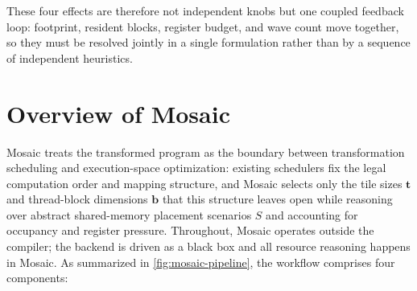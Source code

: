 \documentclass[acmsmall,review,anonymous,screen]{acmart}
\newcommand{\name}{{Mosaic}\xspace}
\newcommand{\tvec}{\mathbf{t}}
\begin{document}
These four effects are therefore not independent knobs but one coupled feedback loop: footprint, resident blocks, register budget, and wave count move together, so they must be resolved jointly in a single formulation rather than by a sequence of independent heuristics.

\section{Overview of \name}
\label{sec:overview}

\name treats the transformed program as the boundary between transformation scheduling and execution-space optimization: existing schedulers fix the legal computation order and mapping structure, and \name selects only the tile sizes \(\tvec\) and thread-block dimensions \(\mathbf{b}\) that this structure leaves open while reasoning over abstract shared-memory placement scenarios \(S\) and accounting for occupancy and register pressure. Throughout, \name operates outside the compiler; the backend is driven as a black box and all resource reasoning happens in \name. As summarized in \autoref{fig:mosaic-pipeline}, the workflow comprises four components:

%
\end{document}
